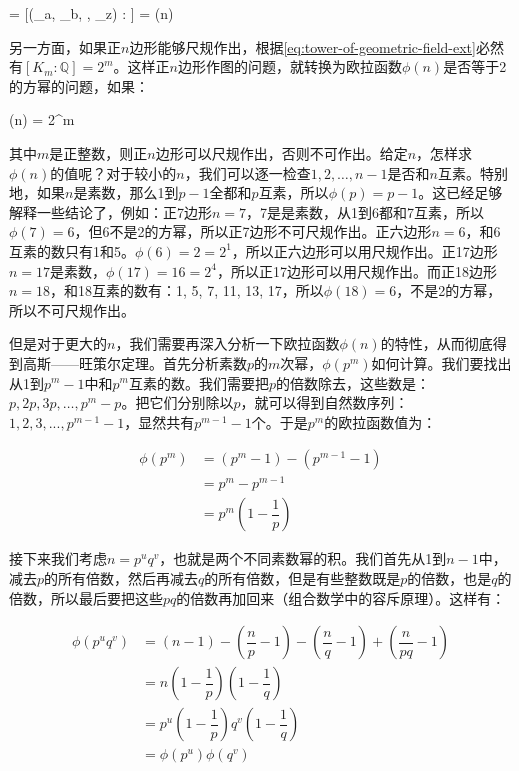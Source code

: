 \be
[K_m : \mathbb{Q}] = [(\zeta_a, \zeta_b, \dotsc, \zeta_z) : ] = \phi(n)
\ee

另一方面，如果正$n$边形能够尺规作出，根据\cref{eq:tower-of-geometric-field-ext}必然有$[K_m : \mathbb{Q}] = 2^m$。这样正$n$边形作图的问题，就转换为欧拉函数$\phi(n)$是否等于2的方幂的问题，如果：

\be
\phi(n) = 2^m
\label{eq:euler-function-as-power-of-2}
\ee

其中$m$是正整数，则正$n$边形可以尺规作出，否则不可作出。给定$n$，怎样求$\phi(n)$的值呢？对于较小的$n$，我们可以逐一检查$1, 2, \dotsc, n - 1$是否和$n$互素。特别地，如果$n$是素数，那么1到$p-1$全都和$p$互素，所以$\phi(p) = p - 1$。这已经足够解释一些结论了，例如：正7边形$n = 7$，7是是素数，从1到6都和7互素，所以$\phi(7) = 6$，但6不是2的方幂，所以正7边形不可尺规作出。正六边形$n = 6$，和6互素的数只有1和5。$\phi(6) = 2 = 2^1$，所以正六边形可以用尺规作出。正17边形$n = 17$是素数，$\phi(17) = 16 = 2^4$，所以正17边形可以用尺规作出。而正18边形$n = 18$，和18互素的数有：1, 5, 7, 11, 13, 17，所以$\phi(18) = 6$，不是2的方幂，所以不可尺规作出。

但是对于更大的$n$，我们需要再深入分析一下欧拉函数$\phi(n)$的特性，从而彻底得到高斯——旺策尔定理。首先分析素数$p$的$m$次幂，$\phi(p^m)$如何计算。我们要找出从1到$p^m-1$中和$p^m$互素的数。我们需要把$p$的倍数除去，这些数是：$p, 2p, 3p, \dotsc, p^m - p$。把它们分别除以$p$，就可以得到自然数序列：$1, 2, 3, ..., p^{m-1} - 1$，显然共有$p^{m-1} - 1$个。于是$p^m$的欧拉函数值为：

\begin{align*}
\phi(p^m) &= (p^m - 1) - (p^{m-1} - 1) \\
            &= p^m - p^{m-1} \\
            &= p^m(1-\dfrac{1}{p})
\end{align*}

接下来我们考虑$n = p^uq^v$，也就是两个不同素数幂的积。我们首先从1到$n-1$中，减去$p$的所有倍数，然后再减去$q$的所有倍数，但是有些整数既是$p$的倍数，也是$q$的倍数，所以最后要把这些$pq$的倍数再加回来（组合数学中的容斥原理）。这样有：

\begin{align*}
\phi(p^uq^v) &=  (n - 1) - (\dfrac{n}{p} - 1) - (\dfrac{n}{q} - 1) + (\dfrac{n}{pq} - 1) \\
          &=  n(1 - \dfrac{1}{p})(1 - \dfrac{1}{q}) \\[5pt]
          &=  p^u(1 - \dfrac{1}{p})q^v(1 - \dfrac{1}{q}) \\[5pt]
          &=  \phi(p^u)\phi(q^v)
\end{align*}

